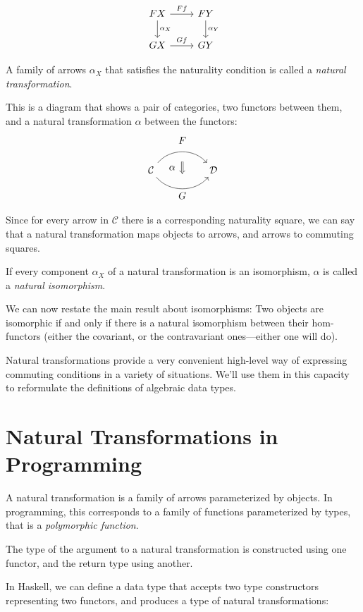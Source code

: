 \documentclass[DaoFP]{subfiles}
\begin{document}
\[
 \begin{tikzcd}
 F X
 \arrow[d, "\alpha_X"]
 \arrow[r, "F f"]
 &
F Y
  \arrow[d, "\alpha_Y"]
 \\
G X
 \arrow[r, "G f"]
& G Y
 \end{tikzcd}
\]

A family of arrows $\alpha_X$ that satisfies the naturality condition is called a \emph{natural transformation}.

This is a diagram that shows a pair of categories, two functors between them, and a natural transformation $\alpha$ between the functors:
\[
\begin{tikzcd}[column sep=huge]
\mathcal{C}
  \arrow[bend left=50]{r}[name=U, label=above:$F$]{}
  \arrow[bend right=50]{r}[name=D, label=below:$G$]{} 
 &
\mathcal{D}
  \arrow[shorten <=10pt,shorten >=10pt,Rightarrow,to path={(U) -- node[label=left:$\alpha$] {} (D)}]{}
\end{tikzcd}
\]


Since for every arrow in $\mathcal{C}$ there is a corresponding naturality square, we can say that a natural transformation maps objects to arrows, and arrows to commuting squares.

If every component $\alpha_X$ of a natural transformation is an isomorphism, $\alpha$ is called a \emph{natural isomorphism}. 

We can now restate the main result about isomorphisms: Two objects are isomorphic if and only if there is a natural isomorphism between their hom-functors (either the covariant, or the contravariant ones---either one will do).

Natural transformations provide a very convenient high-level way of expressing commuting conditions in a variety of situations. We'll use them in this capacity to reformulate the definitions of algebraic data types.

\section{Natural Transformations in Programming}

A natural transformation is a family of arrows parameterized by objects. In programming, this corresponds to a family of functions parameterized by types, that is a \emph{polymorphic function}. 

The type of the argument to a natural transformation is constructed using one functor, and the return type using another. 

In Haskell, we can define a data type that accepts two type constructors representing two functors, and produces a type of natural transformations:
\end{document}
